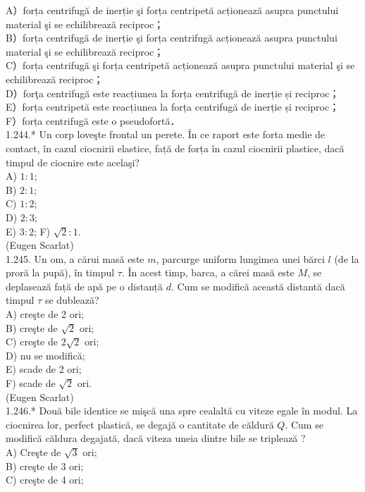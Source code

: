 {A）forța centrifugă de inerție şi forța centripetă acționează asupra punctului material şi se echilibrează reciproc；\\
B）forța centrifugă de inerție şi forța centrifugă acționează asupra punctului material şi se echilibrează reciproc；\\
C）forța centrifugă şi forța centripetă acționează asupra punctului material şi se echilibrează reciproc；\\
D）forţa centrifugă este reacțiunea la forța centrifugă de inerție și reciproc；\\
E）forța centripetă este reacțiunea la forța centrifugă de inerție și reciproc；\\
F）forța centrifugă este o pseudofortă．\\
1.244.* Un corp loveşte frontal un perete. În ce raport este forta medie de contact, în cazul ciocnirii elastice, față de forța în cazul ciocnirii plastice, dacă timpul de ciocnire este acelaşi?\\
A) $1: 1$;\\
B) $2: 1$;\\
C) $1: 2$;\\
D) $2: 3$;\\
E) $3: 2$; F) $\sqrt{2}: 1$.\\
(Eugen Scarlat)\\
1.245. Un om, a cărui masă este $m$, parcurge uniform lungimea unei bărci $l$ (de la proră la pupă), în timpul $\tau$. În acest timp, barca, a cărei masă este $M$, se deplasează faṭă de apă pe o distanță $d$. Cum se modifică această distantă dacă timpul $\tau$ se dublează?\\
A) creşte de 2 ori;\\
B) creşte de $\sqrt{2}$ ori;\\
C) creşte de $2 \sqrt{2}$ ori;\\
D) nu se modifică;\\
E) scade de 2 ori;\\
F) scade de $\sqrt{2}$ ori.\\
(Eugen Scarlat)\\
1.246.* Două bile identice se mişcă una spre cealaltă cu viteze egale în modul. La ciocnirea lor, perfect plastică, se degajă o cantitate de căldură $Q$. Cum se modifică căldura degajată, dacă viteza uneia dintre bile se triplează ?\\
A) Creşte de $\sqrt{3}$ ori;\\
B) creşte de 3 ori;\\
C) creşte de 4 ori;\\
}
